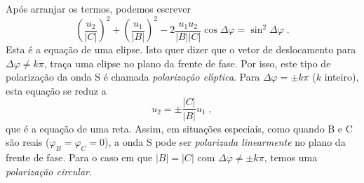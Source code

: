 Ap\'os arranjar os termos, podemos escrever
\begin{equation}
\left(\frac{u_2}{|C|}\right)^2+\left(\frac{u_1}{|B|}\right)^2-2\frac{u_1u_2}{|B||C|}\cos\Delta\varphi=\sin^2\Delta\varphi
\;.
\end{equation}
Esta \'e a equa\c{c}\~ao de uma elipse. Isto quer dizer que o
vetor de deslocamento para $\Delta\varphi \neq k\pi$, tra\c{c}a
uma elipse no plano da frente de fase. Por isso, este tipo de
polariza\c{c}\~ao da onda S \'e chamada {\it polariza\c{c}\~ao
el\'{\i}ptica}. Para $\Delta \varphi = \pm k\pi$ ($k$ inteiro),
esta equa\c{c}\~ao se reduz a
\begin{equation}
u_2 = \pm \frac{|C|}{|B|}u_1 \;,
\end{equation}
que \'e a equa\c{c}\~ao de uma reta. Assim, em situa\c{c}\~oes
especiais, como quando B e C s\~ao reais
($\varphi_B=\varphi_C=0$), a onda S pode ser {\it polarizada
linearmente} no plano da frente de fase. Para o caso em que
$|B|=|C|$ com $\Delta\varphi \neq \pm k\pi$, temos uma {\it
polariza\c{c}\~ao circular}.
